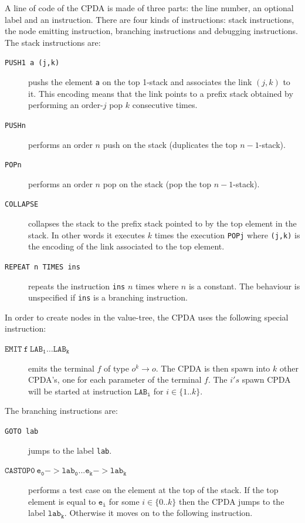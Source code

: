 A line of code of the CPDA is made of three parts: the line number, an optional label and an instruction. There are four kinds of instructions: stack instructions, the node emitting instruction, branching instructions and debugging instructions. The stack instructions are:
\begin{description}
  \item[{\tt PUSH1 a (j,k)}] pushs the element {\tt a} on the top 1-stack and associates the link $(j,k)$ to it. This encoding means that the link points to a prefix stack obtained by performing an order-$j$ pop $k$ consecutive times.
  \item[{\tt PUSHn}] performs an order $n$ push on the stack (\ie duplicates the top $n-1$-stack).
  \item[{\tt POPn}] performs an order $n$ pop on the stack (\ie pop the top $n-1$-stack).
  \item[{\tt COLLAPSE}] collapses the stack to the prefix stack pointed to by the top element in the stack. In other words it executes $k$ times the execution {\tt POPj} where {\tt (j,k)} is the encoding of the link associated to the top element.

  \item[{\tt REPEAT n TIMES ins}] repeats the instruction {\tt ins} $n$ times where $n$ is a constant. The behaviour is unspecified if {\tt ins} is a branching instruction.
\end{description}

In order to create nodes in the value-tree, the CPDA uses the following special instruction:
\begin{description}
  \item[$\mathtt{EMIT\ f\ LAB_1 \ldots LAB_k}$] emits the terminal $f$ of type $o^k \rightarrow o$.
   The CPDA is then spawn into $k$ other CPDA's, one for each parameter of the terminal $f$.
   The $i's$ spawn CPDA will be started at instruction $\mathtt{LAB_i}$ for $i \in \{1..k\}$.
\end{description}

The branching instructions are:
\begin{description}
  \item[{\tt GOTO lab}] jumps to the label {\tt lab}.
  \item[$\mathtt{CASTOP0\ e_0->lab_0 ... e_k->lab_k}$] performs a test case on the element
  at the top of the stack. If the top element is equal to $\mathtt{e_i}$ for some $i \in \{0..k\}$
  then the CPDA jumps to the label $\mathtt{lab_k}$. Otherwise it moves on to the following instruction.
\end{description}


